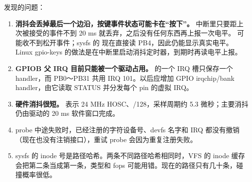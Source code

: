 发现的问题：

\begin{enumerate}
  \item \textbf{消抖会丢掉最后一个边沿，按键事件状态可能卡在“按下”。} 中断里只要距上次被接受的事件不到 20 ms 就丢弃，之后没有任何东西再上报一次电平。 可能收不到松开事件；sysfs 的  现在直接读 PB4，因此仍能显示真实电平。Linux gpio-keys 的做法是在中断里启动消抖定时器，到期时再读电平上报。
  \item \textbf{GPIOB 父 IRQ 目前只能被一个驱动占用。}  的一个 IRQ 槽只保存一个 handler，而 PB0～PB31 共用 IRQ 101。以后应增加 GPIO irqchip/bank handler，由它读取 STATUS 并分发每个 pin 的虚拟 IRQ。
  \item \textbf{硬件消抖很短。}  表示 24 MHz HOSC、/128，采样周期约 5.3 微秒；主要消抖仍由驱动的 20 ms 软件窗口完成。
  \item probe 中途失败时，已经注册的字符设备号、devfs 名字和 IRQ 都没有撤销（现在也没有注销接口），重试 probe 会因为重复注册失败。
  \item sysfs 的 inode 号是路径哈希。两条不同路径哈希相同时，VFS 的 inode 缓存会把第二条当成第一条，类型和 fops 可能用错。现在的路径只有几十条，碰撞概率很低。
\end{enumerate}

